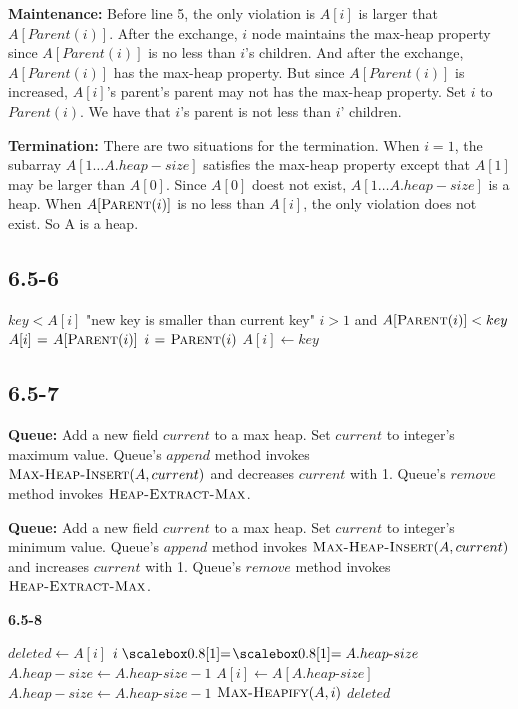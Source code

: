 \documentclass{book}
\begin{document}
\begin{CJK}{UTF8}{gkai}
\textbf{Maintenance:} Before line 5, the only violation is $A[i]$ is larger that 
$A[Parent(i)]$. After the exchange, $i$ node maintains the max-heap property 
since $A[Parent(i)]$ is no less than $i$'s children. And after the exchange, 
$A[Parent(i)]$ has the max-heap property. But since $A[Parent(i)]$ is increased, 
$A[i]$'s parent's parent may not has the max-heap property. Set $i$ to 
$Parent(i)$. We have that $i$'s parent is not less than $i$' children.

\textbf{Termination:} There are two situations for the termination. When $i = 
1$, the subarray $A[1\dots A.heap-size]
$ satisfies the max-heap property except that $A[1]$ may be larger than $A[0]$.  
Since $A[0]$ doest not exist, $A[1\dots A.heap-size]$ is a heap. When 
$A[\textnormal{\scshape Parent}(i)]$ is no less than $A[i]$, the only violation does not exist. 
So A is a heap.

\subsection*{6.5-6}
\begin{codebox}
\li \If $key < A[i]$
\li \Then \Error "new key is smaller than current key"
\End
\li \While $i > 1 $ and $A[\textnormal{\scshape Parent}(i)] < key$
\li \Do $A[i] \mathrel{\hspace{1pt}=\hspace{1pt}} A[\textnormal{\scshape Parent}(i)]$
\li $i \mathrel{\hspace{1pt}=\hspace{1pt}} \textnormal{\scshape Parent}(i)$
\End
\li $A[i] \gets key$
\end{codebox}

\subsection*{6.5-7}
\textbf{Queue:} Add a new field $current$ to a max heap. Set $current$ to 
integer's maximum value. Queue's $append$ method invokes 
$\textnormal{\scshape Max-Heap-Insert}(A, current)$ and decreases $current$ with 1. Queue's 
$remove$ method invokes $\textnormal{\scshape Heap-Extract-Max}$.

\textbf{Queue:} Add a new field $current$ to a max heap. Set $current$ to 
integer's minimum value. Queue's $append$ method invokes 
$\textnormal{\scshape Max-Heap-Insert}(A, current)$ and increases $current$ with 1. Queue's 
$remove$ method invokes $\textnormal{\scshape Heap-Extract-Max}$.

\textbf{6.5-8}
\begin{codebox}
\li $deleted \gets A[i]$
\li \If $i \isequal A.heap\mbox{-}size$
\li \Then $A.heap-size \gets A.heap\mbox{-}size - 1$
\li \Else $A[i] \gets A[A.heap\mbox{-}size]$
\li $A.heap-size \gets A.heap\mbox{-}size - 1$
\li $\textnormal{\scshape Max-Heapify}(A,i)$
\End
\li \Return $deleted$
\end{codebox}


\end{CJK}
\end{document}
